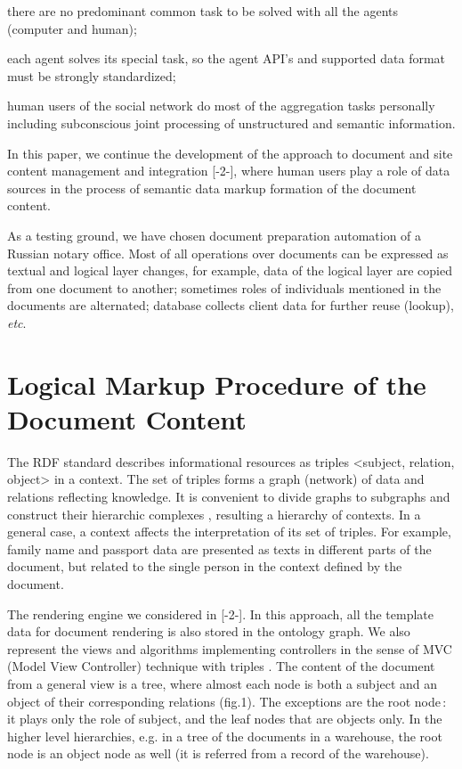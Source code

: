 \documentclass[utf8]{../IncArticle}
\begin{document}
\begin{IEEEitemize}[\IEEEsetlabelwidth{Z}]
\item there are no predominant common task to be solved with all the agents (computer and human);
\item each agent solves its special task, so the agent API’s and supported data format must be strongly standardized;
\item human users of the social network do most of the aggregation tasks personally including subconscious joint processing of unstructured and semantic information.
\end{IEEEitemize}

In this paper, we continue the development of the approach to document and site content management and integration [-2-], where human users play a role of data sources in the process of semantic data markup formation of the document content.

As a testing ground, we have chosen document preparation automation of a Russian notary office. Most of all operations over documents can be expressed as textual and logical layer changes, for example, data of the logical layer are copied from one document to another; sometimes roles of individuals mentioned in the documents are alternated; database collects client data for further reuse (lookup), \emph{etc}.

\section{Logical Markup Procedure of the Document Content}

The RDF standard describes informational resources as triples <subject, relation, object> in a context. The set of triples forms a graph (network) of data and relations reflecting knowledge. It is convenient to divide graphs to subgraphs and construct their hierarchic complexes \cite{b4}, resulting a hierarchy of contexts. In a general case, a context affects the interpretation of its set of triples. For example, family name and passport data are presented as texts in different parts of the document, but related to the single person in the context defined by the document.

The rendering engine we considered in [-2-]. In this approach, all the template data for document rendering is also stored in the ontology graph. We also represent the views and algorithms implementing controllers in the sense of MVC (Model View Controller) technique with triples \cite{b5}. The content of the document from a general view is a tree, where almost each node is both a subject and an object of their corresponding relations (fig.1). The exceptions are the root node\,: it plays only the role of subject, and the leaf nodes that are objects only. In the higher level hierarchies, e.g. in a tree of the documents in a warehouse, the root node is an object node as well (it is referred from a record of the warehouse).
\end{document}
